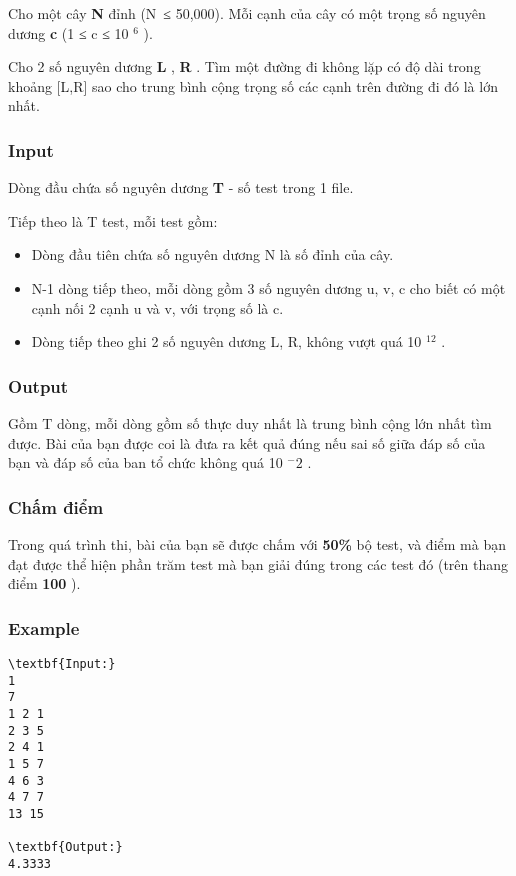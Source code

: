 



   Cho một cây   \textbf{    N   }   đỉnh (N ≤ 50,000). Mỗi cạnh của cây có một trọng số nguyên dương   \textbf{    c   }   (1 ≤ c ≤ 10   $^    6   $   ).  

   Cho 2 số nguyên dương   \textbf{    L   }   ,   \textbf{    R   }   . Tìm một đường đi không lặp có độ dài trong khoảng [L,R] sao cho trung bình cộng trọng số các cạnh trên đường đi đó là lớn nhất.  

\subsubsection{   Input  }

   Dòng đầu chứa số nguyên dương   \textbf{    T   }   - số test trong 1 file.  

   Tiếp theo là T test, mỗi test gồm:  
\begin{itemize}
	\item     Dòng đầu tiên chứa số nguyên dương N là số đỉnh của cây.   
	\item     N-1 dòng tiếp theo, mỗi dòng gồm 3 số nguyên dương u, v, c cho biết có một cạnh nối 2 cạnh u và v, với trọng số là c.   
	\item     Dòng tiếp theo ghi 2 số nguyên dương L, R, không vượt quá 10    $^     12    $    .   
\end{itemize}

\subsubsection{   Output  }

   Gồm T dòng, mỗi dòng gồm số thực duy nhất là trung bình cộng lớn nhất tìm được. Bài của bạn được coi là đưa ra kết quả đúng nếu sai số giữa đáp số của bạn và đáp số của ban tổ chức không quá 10   $^    -2   $   .  

\subsubsection{   Chấm điểm  }

   Trong quá trình thi, bài của bạn sẽ được chấm với   \textbf{    50\%   }   bộ test, và điểm mà bạn đạt được thể hiện phần trăm test mà bạn giải đúng trong các test đó (trên thang điểm   \textbf{    100   }   ).  

\subsubsection{   Example  }
\begin{verbatim}
\textbf{Input:}
1
7
1 2 1
2 3 5
2 4 1
1 5 7
4 6 3
4 7 7
13 15

\textbf{Output:}
4.3333

\end{verbatim}